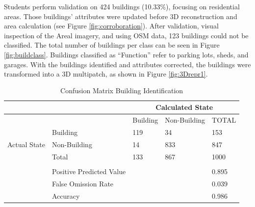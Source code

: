 \documentclass[authoryear,preprint,review,12pt]{elsarticle}
\begin{document}
    Students perform validation on 424 buildings (10.33\%), focusing on residential areas. Those buildings' attributes were updated before 3D reconstruction and area calculation (see Figure \ref{fig:corroboration}). After validation, visual inspection of the Areal imagery, and using OSM data, 123 buildings could not be classified. The total number of buildings per class can be seen in Figure \ref{fig:buildclass}. Buildings classified as “Function” refer to parking lots, sheds, and garages. With the buildings identified and attributes corrected, the buildings were transformed into a 3D multipatch, as shown in Figure \ref{fig:3Drepr1}.

    \begin{table}[h]
        \caption{Confusion Matrix Building Identification}
        \label{tab:confMatrix}
        \scriptsize
        \begin{tabularx}{\linewidth}{XXXXX}
        \toprule
                                                        &                          & \multicolumn{3}{c}{Calculated State} \\ \midrule
        \multicolumn{1}{l|}{}                              &                          & Building   & Non-Building   & TOTAL  \\
        \multicolumn{1}{c|}{\multirow{3}{*}{Actual State}} & Building                 & 119        & 34             & 153    \\
        \multicolumn{1}{c|}{}                              & Non-Building             & 14         & 833            & 847    \\
        \multicolumn{1}{c|}{}                              & Total                    & 133        & 867            & 1000   \\ \midrule
                                                        &                          &            &                &        \\
                                                        & Positive Predicted Value &            &                & 0.895  \\
                                                        & False Omission Rate      &            &                & 0.039  \\
                                                        & Accuracy                 &            &                & 0.986  \\ \bottomrule
        \end{tabularx}
    \end{table}
\end{document}

